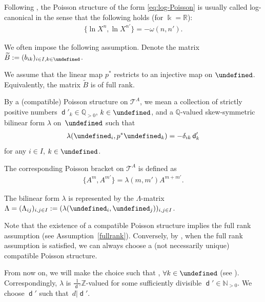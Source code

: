 \documentclass[10pt,a4paper]{amsart}
\newcommand{\kk}{\Bbbk}
\newcommand{\Z}{\mathbb{Z}}
\newcommand{\N}{\mathbb{N}}
\newcommand{\Q}{\mathbb{Q}}
\newcommand{\R}{\mathbb{R}}
\newcommand{\opname}[1]{\operatorname{\mathsf{#1}}}
\newcommand{\cT}{{\mathcal T}}
\newcommand{\tB}{{\widetilde{B}}}
\newcommand{\diag}{{\delta}}
\renewcommand{\diag}{{d}}
\newcommand{\ufv}{\opname{uf}}
\let\Mc\undefined
\let\Nufv\undefined
\let\Iufv\undefined
\let\ee\undefined
\let\ff\undefined
\newcommand{\Mc}{M^\circ}
\newcommand{\Nufv}{N_{\opname{uf}}}
\newcommand{\Iufv}{I_{\ufv}}
\renewcommand{\diag}{\opname{d}'}
\newcommand{\ee}{\mathbf{e}}
\newcommand{\ff}{\mathbf{f}}
\numberwithin{equation}{section}
\begin{document}
\begin{Remark}
Following \cite{GekhtmanShapiroVainshtein03,GekhtmanShapiroVainshtein05},
the Poisson structure of the form \eqref{eq:log-Poisson} is usually
called log-canonical in the sense that the following holds (for $\kk=\R$):
\begin{align*}
\big\{\ln X^{n},\ln X^{n'}\big\} =-\omega(n,n').
\end{align*}
\end{Remark}

We often impose the following assumption. Denote the matrix $\tB:=(b_{ik})_{i\in I,k\in\Iufv}$.

\begin{Assumption}\label{fullrank}
We assume that the linear map $p^{*}$ restricts to an injective map
on $\Nufv$. Equivalently, the matrix $\tB$ is of full rank.
\end{Assumption}

\begin{Definition}\label{def:compatible_poisson_A}
By a (compatible) Poisson structure on $\cT^{A}$, we mean a collection
of strictly positive numbers $\diag_{k} \in \Q_{>0}$, $k\in\Iufv$, and a $\Q$-valued
skew-symmetric bilinear form $\lambda$ on~$\Mc$ such that
\begin{gather*}
\lambda(\ff_{i},p^{*}\ee_{k}) = -\delta_{ik}\diag_{k}
\end{gather*}
for any $i\in I$, $k\in\Iufv$.

The corresponding Poisson bracket on $\cT^{A}$ is defined as
\begin{gather*}
\bigl\{A^{m},A^{m'}\bigr\} = \lambda(m,m')A^{m+m'}.
\end{gather*}

The bilinear form $\lambda$ is represented by the $\Lambda$-matrix
$\Lambda=(\Lambda_{ij})_{i,j\in I}:=(\lambda(\ff_{i},\ff_{j}))_{i,j\in I}$.
\end{Definition}

Note that the existence of a compatible Poisson structure implies the full rank assumption (see Assumption~\ref{fullrank}). Conversely, by \cite{GekhtmanShapiroVainshtein03,GekhtmanShapiroVainshtein05},
when the full rank assumption is satisfied, we can always choose a
(not necessarily unique) compatible Poisson structure.

From now on, we will make
the choice such that \smash{$\diag_{k}=\frac{1}{d_{k}}$}, $\forall k\in\Iufv$
(see \cite[Proposition 3.3]{BerensteinZelevinsky05}). Correspondingly, $\lambda$ is $\frac{1}{\diag}\Z$-valued for some sufficiently divisible $\diag\in \N_{>0}$. We choose $\diag$ such that~$d| \diag$.
\end{document}

